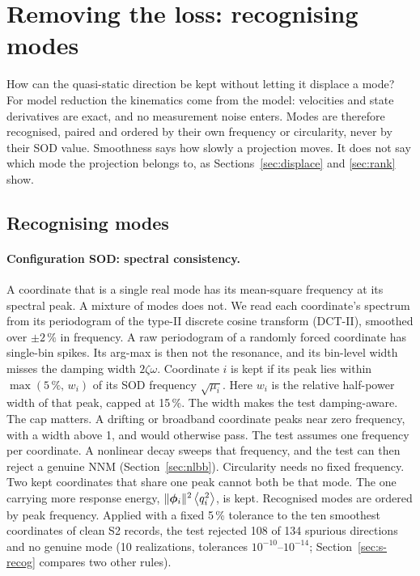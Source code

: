 \documentclass[preprint,12pt]{elsarticle}
\begin{document}
\section{Removing the loss: recognising modes}\label{sec:noise}
How can the quasi-static direction be kept without letting it displace a mode?
For model reduction the kinematics come from the model: velocities and state derivatives are exact, and no measurement noise enters.
Modes are therefore recognised, paired and ordered by their own frequency or circularity, never by their SOD value. Smoothness says how slowly a projection moves. It does not say which mode the projection belongs to, as Sections~\ref{sec:displace} and \ref{sec:rank} show.

\subsection{Recognising modes}\label{sec:recog}
\paragraph{Configuration SOD: spectral consistency.} A coordinate that is a single real mode has its mean-square frequency at its spectral peak. A mixture of modes does not. We read each coordinate's spectrum from its periodogram of the type-II discrete cosine transform (DCT-II), smoothed over $\pm2\,\%$ in frequency. A raw periodogram of a randomly forced coordinate has single-bin spikes. Its arg-max is then not the resonance, and its bin-level width misses the damping width $2\zeta\omega$. Coordinate $i$ is kept if its peak lies within $\max(5\,\%,\,w_i)$ of its SOD frequency $\sqrt{\mu_i}$. Here $w_i$ is the relative half-power width of that peak, capped at 15\,\%. The width makes the test damping-aware. The cap matters. A drifting or broadband coordinate peaks near zero frequency, with a width above 1, and would otherwise pass. The test assumes one frequency per coordinate. A nonlinear decay sweeps that frequency, and the test can then reject a genuine NNM (Section~\ref{sec:nlbb}). Circularity needs no fixed frequency. Two kept coordinates that share one peak cannot both be that mode. The one carrying more response energy, $\|\bm{\phi}_i\|^2\left\langle q_i^2 \right\rangle$, is kept. Recognised modes are ordered by peak frequency.
Applied with a fixed 5\,\% tolerance to the ten smoothest coordinates of clean S2 records, the test rejected 108 of 134 spurious directions and no genuine mode (10 realizations, tolerances $10^{-10}$--$10^{-14}$; Section~\ref{sec:s-recog} compares two other rules).
\end{document}

